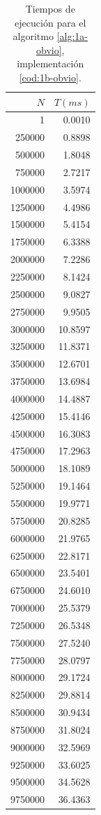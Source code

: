 \begin{table}
	\footnotesize
	\centering
	\begin{tabular}{|r|r|}
        \hline
        $N$ & $T (ms)$ \\
        \hline
		1 & 0.0010 \\ 
		250000 & 0.8898 \\ 
		500000 & 1.8048 \\ 
		750000 & 2.7217 \\ 
		1000000 & 3.5974 \\ 
		1250000 & 4.4986 \\ 
		1500000 & 5.4154 \\ 
		1750000 & 6.3388 \\ 
		2000000 & 7.2286 \\ 
		2250000 & 8.1424 \\ 
		2500000 & 9.0827 \\ 
		2750000 & 9.9505 \\ 
		3000000 & 10.8597 \\ 
		3250000 & 11.8371 \\ 
		3500000 & 12.6701 \\ 
		3750000 & 13.6984 \\ 
		4000000 & 14.4887 \\ 
		4250000 & 15.4146 \\ 
		4500000 & 16.3083 \\ 
		4750000 & 17.2963 \\ 
		5000000 & 18.1089 \\ 
		5250000 & 19.1464 \\ 
		5500000 & 19.9771 \\ 
		5750000 & 20.8285 \\ 
		6000000 & 21.9765 \\ 
		6250000 & 22.8171 \\ 
		6500000 & 23.5401 \\ 
		6750000 & 24.6010 \\ 
		7000000 & 25.5379 \\ 
		7250000 & 26.5348 \\ 
		7500000 & 27.5240 \\ 
		7750000 & 28.0797 \\ 
		8000000 & 29.1724 \\ 
		8250000 & 29.8814 \\ 
		8500000 & 30.9434 \\ 
		8750000 & 31.8024 \\ 
		9000000 & 32.5969 \\ 
		9250000 & 33.6025 \\ 
		9500000 & 34.5628 \\ 
		9750000 & 36.4363 \\ 
        \hline
	\end{tabular}

    \caption{Tiempos de ejecución para el algoritmo \ref{alg:1a-obvio}, implementación \ref{cod:1b-obvio}.}
    \label{tab:1b-obvio}
\end{table}

